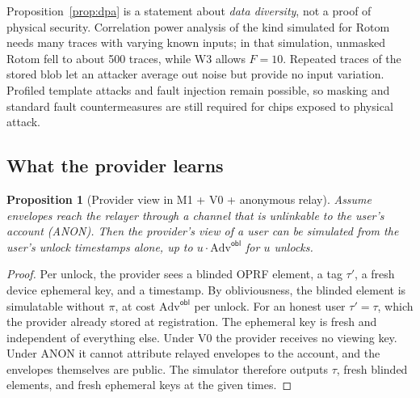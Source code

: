 \documentclass[11pt]{article}
\newtheorem{proposition}{Proposition}
\theoremstyle{remark}
\begin{document}
Proposition~\ref{prop:dpa} is a statement about \emph{data diversity}, not a proof of physical security. Correlation power analysis of the kind simulated for Rotom~\cite[§5.4.2]{rotom26} needs many traces with varying known inputs; in that simulation, unmasked Rotom fell to about 500 traces, while W3 allows $F = 10$. Repeated traces of the stored blob let an attacker average out noise but provide no input variation. Profiled template attacks and fault injection remain possible, so masking and standard fault countermeasures are still required for chips exposed to physical attack.

\subsection{What the provider learns}
\label{sec:graph}

\begin{proposition}[Provider view in M1 + V0 + anonymous relay]
\label{prop:view}
Assume envelopes reach the relayer through a channel that is unlinkable to the user's account (ANON). Then the provider's view of a user can be simulated from the user's unlock timestamps alone, up to $u\cdot\mathrm{Adv}^{\mathsf{obl}}$ for $u$ unlocks.
\end{proposition}
\begin{proof}
Per unlock, the provider sees a blinded OPRF element, a tag $\tau'$, a fresh device ephemeral key, and a timestamp. By obliviousness, the blinded element is simulatable without $\pi$, at cost $\mathrm{Adv}^{\mathsf{obl}}$ per unlock. For an honest user $\tau' = \tau$, which the provider already stored at registration. The ephemeral key is fresh and independent of everything else. Under V0 the provider receives no viewing key. Under ANON it cannot attribute relayed envelopes to the account, and the envelopes themselves are public. The simulator therefore outputs $\tau$, fresh blinded elements, and fresh ephemeral keys at the given times.
\end{proof}
\end{document}
